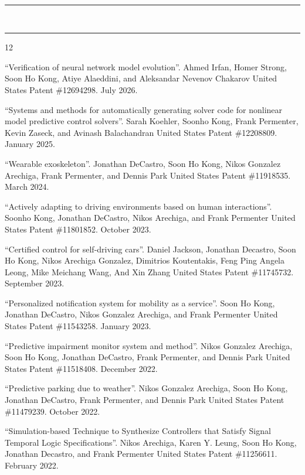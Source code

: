 \documentclass[10pt, letterpaper]{article}
\newcommand{\mysection}[1]{
  \vspace{20pt}\noindent{\rmfamily\mdseries \Large #1}\\
  \vspace{-6pt}\hrule\vspace{3pt}
}
\begin{document}

\mysection{Publications}


\nocite{*}
\printbibliography[heading=none]

\mysection{Patents}

\begin{thebibliography}{12}

 ``Verification of neural network model evolution''.
Ahmed Irfan, Homer Strong, Soon Ho Kong, Atiye Alaeddini, and Aleksandar Nevenov Chakarov
United States Patent \#12694298. July 2026.

 ``Systems and methods for automatically generating solver code for nonlinear model predictive control solvers''.
Sarah Koehler, Soonho Kong, Frank Permenter, Kevin Zaseck, and Avinash Balachandran
United States Patent \#12208809. January 2025.

 ``Wearable exoskeleton''.
Jonathan DeCastro, Soon Ho Kong, Nikos Gonzalez Arechiga, Frank Permenter, and Dennis Park
United States Patent \#11918535. March 2024.

 ``Actively adapting to driving environments based on human interactions''.
Soonho Kong, Jonathan DeCastro, Nikos Arechiga, and Frank Permenter
United States Patent \#11801852. October 2023.

``Certified control for self-driving cars''.
Daniel Jackson, Jonathan Decastro, Soon Ho Kong, Nikos Arechiga Gonzalez, Dimitrios Koutentakis, Feng Ping Angela Leong, Mike Meichang Wang, And Xin Zhang
United States Patent \#11745732. September 2023.

 ``Personalized notification system for mobility as a service''.
Soon Ho Kong, Jonathan DeCastro, Nikos Gonzalez Arechiga, and Frank Permenter
United States Patent \#11543258. January 2023.

``Predictive impairment monitor system and method''.
Nikos Gonzalez Arechiga, Soon Ho Kong, Jonathan DeCastro, Frank Permenter, and Dennis Park
United States Patent \#11518408. December 2022.

``Predictive parking due to weather''.
Nikos Gonzalez Arechiga, Soon Ho Kong, Jonathan DeCastro, Frank Permenter, and Dennis Park
United States Patent \#11479239. October 2022.

``Simulation-based Technique to Synthesize Controllers that Satisfy Signal Temporal Logic Specifications''.
Nikos Arechiga, Karen Y. Leung, Soon Ho Kong, Jonathan Decastro, and Frank Permenter
United States Patent \#11256611. February 2022.


\end{thebibliography}
\end{document}

